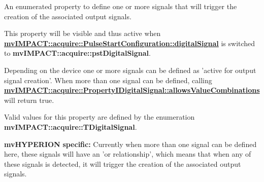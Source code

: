 An enumerated property to define one or more signals that will trigger the creation of the associated output signals. 

This property will be visible and thus active when {\bfseries \hyperlink{classmv_i_m_p_a_c_t_1_1acquire_1_1_pulse_start_configuration_a5cf89b1d644e0ba87fa1a254f7d2a0df}{mv\+I\+M\+P\+A\+C\+T\+::acquire\+::\+Pulse\+Start\+Configuration\+::digital\+Signal}} is switched to {\bfseries mv\+I\+M\+P\+A\+C\+T\+::acquire\+::pst\+Digital\+Signal}.

Depending on the device one or more signals can be defined as 'active for output signal creation'. When more than one signal can be defined, calling {\bfseries \hyperlink{classmv_i_m_p_a_c_t_1_1acquire_1_1_property_a098821f15ac08dbcd48af11b96ce8284}{mv\+I\+M\+P\+A\+C\+T\+::acquire\+::\+Property\+I\+Digital\+Signal\+::allows\+Value\+Combinations}} will return true.

Valid values for this property are defined by the enumeration {\bfseries mv\+I\+M\+P\+A\+C\+T\+::acquire\+::\+T\+Digital\+Signal}.

{\bfseries mv\+H\+Y\+P\+E\+R\+I\+O\+N} {\bfseries specific\+:} Currently when more than one signal can be defined here, these signals will have an 'or relationship', which means that when any of these signals is detected, it will trigger the creation of the associated output signals.

